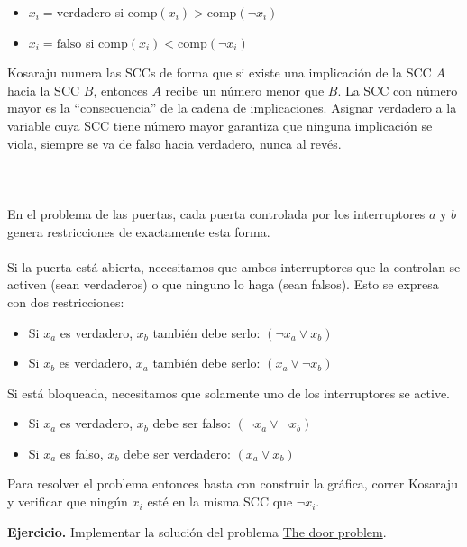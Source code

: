 \begin{itemize}
    \item $x_i = \text{verdadero}$ si $\text{comp}(x_i) > \text{comp}(\neg x_i)$
    \item $x_i = \text{falso}$ si $\text{comp}(x_i) < \text{comp}(\neg x_i)$
\end{itemize}
Kosaraju numera las SCCs de forma que si existe una implicación de la SCC $A$ hacia la SCC $B$, entonces $A$ recibe un número menor que $B$. La SCC con número mayor es la ``consecuencia'' de la cadena de implicaciones. Asignar verdadero a la variable cuya
SCC tiene número mayor garantiza que ninguna implicación se viola, siempre se va de falso hacia verdadero, nunca al revés.
\\\\
\\\\
En el problema de las puertas, cada puerta controlada por los interruptores $a$ y $b$ genera restricciones de exactamente esta forma.
\\\\Si la puerta está abierta, necesitamos que ambos interruptores que la controlan se activen (sean verdaderos) o que ninguno lo haga (sean falsos). 
Esto se expresa con dos restricciones:
\begin{itemize}
    \item Si $x_a$ es verdadero, $x_b$ también debe serlo:
          $(\neg x_a \lor x_b)$
    \item Si $x_b$ es verdadero, $x_a$ también debe serlo:
          $(x_a \lor \neg x_b)$
\end{itemize}
Si está bloqueada, necesitamos que solamente uno de los interruptores se active.
\begin{itemize}
    \item Si $x_a$ es verdadero, $x_b$ debe ser falso:
          $(\neg x_a \lor \neg x_b)$
    \item Si $x_a$ es falso, $x_b$ debe ser verdadero:
          $(x_a \lor x_b)$
\end{itemize}
Para resolver el problema entonces basta con construir la gráfica, correr Kosaraju y verificar que ningún $x_i$ esté en la misma SCC que $\neg x_i$.

\textbf{Ejercicio.} Implementar la solución del problema \href{https://codeforces.com/problemset/problem/776/D}{The door problem}.
 
